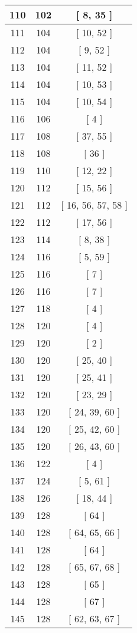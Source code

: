 \begin{center}
\begin{longtable}[H]{|| c c c ||}
\hline
110 & 102 & [ 8, 35 ] \\ 
\hline
111 & 104 & [ 10, 52 ] \\ 
\hline
112 & 104 & [ 9, 52 ] \\ 
\hline
113 & 104 & [ 11, 52 ] \\ 
\hline
114 & 104 & [ 10, 53 ] \\ 
\hline
115 & 104 & [ 10, 54 ] \\ 
\hline
116 & 106 & [ 4 ] \\ 
\hline
117 & 108 & [ 37, 55 ] \\ 
\hline
118 & 108 & [ 36 ] \\ 
\hline
119 & 110 & [ 12, 22 ] \\ 
\hline
120 & 112 & [ 15, 56 ] \\ 
\hline
121 & 112 & [ 16, 56, 57, 58 ] \\ 
\hline
122 & 112 & [ 17, 56 ] \\ 
\hline
123 & 114 & [ 8, 38 ] \\ 
\hline
124 & 116 & [ 5, 59 ] \\ 
\hline
125 & 116 & [ 7 ] \\ 
\hline
126 & 116 & [ 7 ] \\ 
\hline
127 & 118 & [ 4 ] \\ 
\hline
128 & 120 & [ 4 ] \\ 
\hline
129 & 120 & [ 2 ] \\ 
\hline
130 & 120 & [ 25, 40 ] \\ 
\hline
131 & 120 & [ 25, 41 ] \\ 
\hline
132 & 120 & [ 23, 29 ] \\ 
\hline
133 & 120 & [ 24, 39, 60 ] \\ 
\hline
134 & 120 & [ 25, 42, 60 ] \\ 
\hline
135 & 120 & [ 26, 43, 60 ] \\ 
\hline
136 & 122 & [ 4 ] \\ 
\hline
137 & 124 & [ 5, 61 ] \\ 
\hline
138 & 126 & [ 18, 44 ] \\ 
\hline
139 & 128 & [ 64 ] \\ 
\hline
140 & 128 & [ 64, 65, 66 ] \\ 
\hline
141 & 128 & [ 64 ] \\ 
\hline
142 & 128 & [ 65, 67, 68 ] \\ 
\hline
143 & 128 & [ 65 ] \\ 
\hline
144 & 128 & [ 67 ] \\ 
\hline
145 & 128 & [ 62, 63, 67 ] \\ 

\end{longtable}
\end{center}
